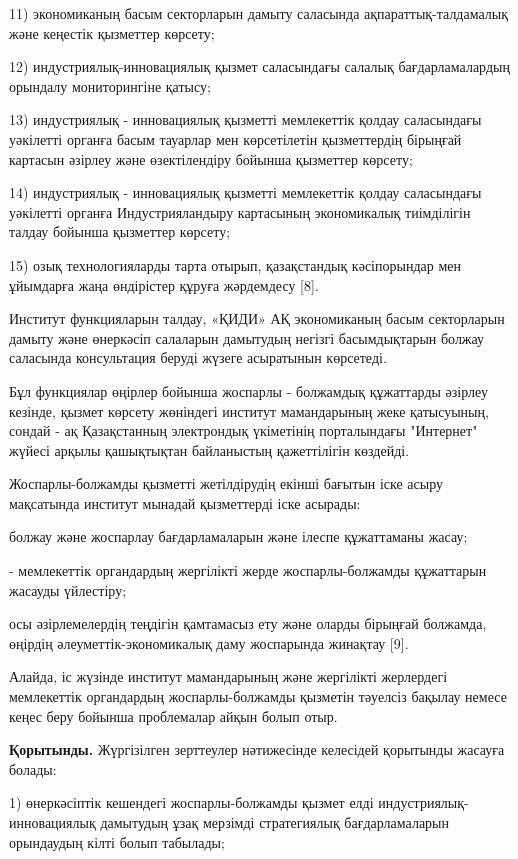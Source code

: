 11) экономиканың басым секторларын дамыту саласында
ақпараттық-талдамалық және кеңестік қызметтер көрсету;

12) индустриялық-инновациялық қызмет саласындағы салалық
бағдарламалардың орындалу мониторингіне қатысу;

13) индустриялық - инновациялық қызметті мемлекеттік қолдау саласындағы
уәкілетті органға басым тауарлар мен көрсетілетін қызметтердің бірыңғай
картасын әзірлеу және өзектілендіру бойынша қызметтер көрсету;

14) индустриялық - инновациялық қызметті мемлекеттік қолдау саласындағы
уәкілетті органға Индустрияландыру картасының экономикалық тиімділігін
талдау бойынша қызметтер көрсету;

15) озық технологияларды тарта отырып, қазақстандық кәсіпорындар мен
ұйымдарға жаңа өндірістер құруға жәрдемдесу {[}8{]}.

Институт функцияларын талдау, «ҚИДИ» АҚ экономиканың басым секторларын
дамыту және өнеркәсіп салаларын дамытудың негізгі басымдықтарын болжау
саласында консультация беруді жүзеге асыратынын көрсетеді.

Бұл функциялар өңірлер бойынша жоспарлы - болжамдық құжаттарды әзірлеу
кезінде, қызмет көрсету жөніндегі институт мамандарының жеке қатысуының,
сондай - ақ Қазақстанның электрондық үкіметінің порталындағы "Интернет"
жүйесі арқылы қашықтықтан байланыстың қажеттілігін көздейді.

Жоспарлы-болжамды қызметті жетілдірудің екінші бағытын іске асыру
мақсатында институт мынадай қызметтерді іске асырады:

болжау және жоспарлау бағдарламаларын және ілеспе құжаттаманы жасау;

- мемлекеттік органдардың жергілікті жерде жоспарлы-болжамды құжаттарын
жасауды үйлестіру;

осы әзірлемелердің теңдігін қамтамасыз ету және оларды бірыңғай
болжамда, өңірдің әлеуметтік-экономикалық даму жоспарында жинақтау
{[}9{]}.

Алайда, іс жүзінде институт мамандарының және жергілікті жерлердегі
мемлекеттік органдардың жоспарлы-болжамды қызметін тәуелсіз бақылау
немесе кеңес беру бойынша проблемалар айқын болып отыр.

{\bfseries Қорытынды.} Жүргізілген зерттеулер нәтижесінде келесідей
қорытынды жасауға болады:

1) өнеркәсіптік кешендегі жоспарлы-болжамды қызмет елді
индустриялық-инновациялық дамытудың ұзақ мерзімді стратегиялық
бағдарламаларын орындаудың кілті болып табылады;

